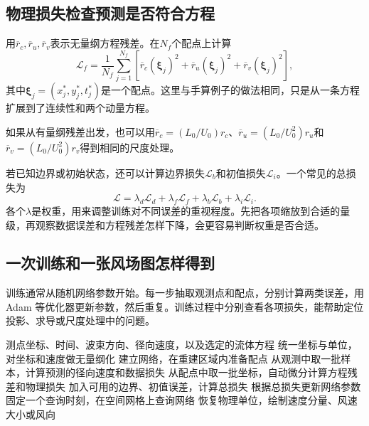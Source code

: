 \subsection{物理损失检查预测是否符合方程}
用$\overline r_c,\overline r_u,\overline r_v$表示无量纲方程残差。在$N_f$个配点上计算
\begin{equation}
 \mathcal L_f=\frac1{N_f}\sum_{j=1}^{N_f}
 \left[\overline r_c(\boldsymbol\xi_j)^2+
 \overline r_u(\boldsymbol\xi_j)^2+
 \overline r_v(\boldsymbol\xi_j)^2\right],
\end{equation}
其中$\boldsymbol\xi_j=(x_j^*,y_j^*,t_j^*)$是一个配点。这里与手算例子的做法相同，只是从一条方程扩展到了连续性和两个动量方程。

如果从有量纲残差出发，也可以用$\overline r_c=(L_0/U_0)r_c$、$\overline r_u=(L_0/U_0^2)r_u$和$\overline r_v=(L_0/U_0^2)r_v$得到相同的尺度处理。

若已知边界或初始状态，还可以计算边界损失$\mathcal L_b$和初值损失$\mathcal L_i$。一个常见的总损失为
\begin{equation}
 \mathcal L=\lambda_d\mathcal L_d+\lambda_f\mathcal L_f
 +\lambda_b\mathcal L_b+\lambda_i\mathcal L_i.
 \label{eq:pinn-loss}
\end{equation}
各个$\lambda$是权重，用来调整训练对不同误差的重视程度。先把各项缩放到合适的量级，再观察数据误差和方程残差怎样下降，会更容易判断权重是否合适。

\subsection{一次训练和一张风场图怎样得到}
训练通常从随机网络参数开始。每一步抽取观测点和配点，分别计算两类误差，用 Adam 等优化器更新参数，然后重复。训练过程中分别查看各项损失，能帮助定位投影、求导或尺度处理中的问题。

\begin{algorithm}[htbp]
\caption{从稀疏雷达观测训练风场 PINN}
\label{alg:pinn-wind}
\begin{algorithmic}[1]
\Require 测点坐标、时间、波束方向、径向速度，以及选定的流体方程
\State 统一坐标与单位，对坐标和速度做无量纲化
\State 建立网络，在重建区域内准备配点
 \State 从观测中取一批样本，计算预测的径向速度和数据损失
 \State 从配点中取一批坐标，自动微分计算方程残差和物理损失
 \State 加入可用的边界、初值误差，计算总损失
 \State 根据总损失更新网络参数
\EndFor
\State 固定一个查询时刻，在空间网格上查询网络
\State 恢复物理单位，绘制速度分量、风速大小或风向
\end{algorithmic}
\end{algorithm}

